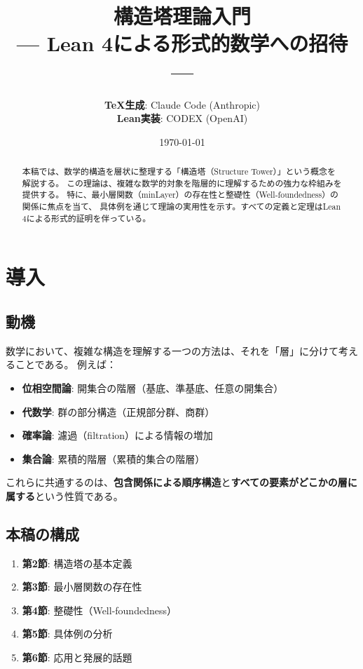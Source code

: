\documentclass[a4paper,12pt]{ltjsarticle}
\title{構造塔理論入門\\
{\large — Lean 4による形式的数学への招待 —}}
\author{
    \textbf{TeX生成}: Claude Code (Anthropic) \\
    \textbf{Lean実装}: CODEX (OpenAI)
}
\date{\today}
\begin{document}
\maketitle

\begin{abstract}
本稿では、数学的構造を層状に整理する「構造塔（Structure Tower）」という概念を解説する。
この理論は、複雑な数学的対象を階層的に理解するための強力な枠組みを提供する。
特に、最小層関数（minLayer）の存在性と整礎性（Well-foundedness）の関係に焦点を当て、
具体例を通じて理論の実用性を示す。すべての定義と定理はLean 4による形式的証明を伴っている。
\end{abstract}

\tableofcontents
\newpage

\section{導入}

\subsection{動機}

数学において、複雑な構造を理解する一つの方法は、それを「層」に分けて考えることである。
例えば：

\begin{itemize}
    \item \textbf{位相空間論}: 開集合の階層（基底、準基底、任意の開集合）
    \item \textbf{代数学}: 群の部分構造（正規部分群、商群）
    \item \textbf{確率論}: 濾過（filtration）による情報の増加
    \item \textbf{集合論}: 累積的階層（累積的集合の階層）
\end{itemize}

これらに共通するのは、\textbf{包含関係による順序構造}と\textbf{すべての要素がどこかの層に属する}という性質である。

\subsection{本稿の構成}

\begin{enumerate}
    \item \textbf{第2節}: 構造塔の基本定義
    \item \textbf{第3節}: 最小層関数の存在性
    \item \textbf{第4節}: 整礎性（Well-foundedness）
    \item \textbf{第5節}: 具体例の分析
    \item \textbf{第6節}: 応用と発展的話題
\end{enumerate}
\end{document}
